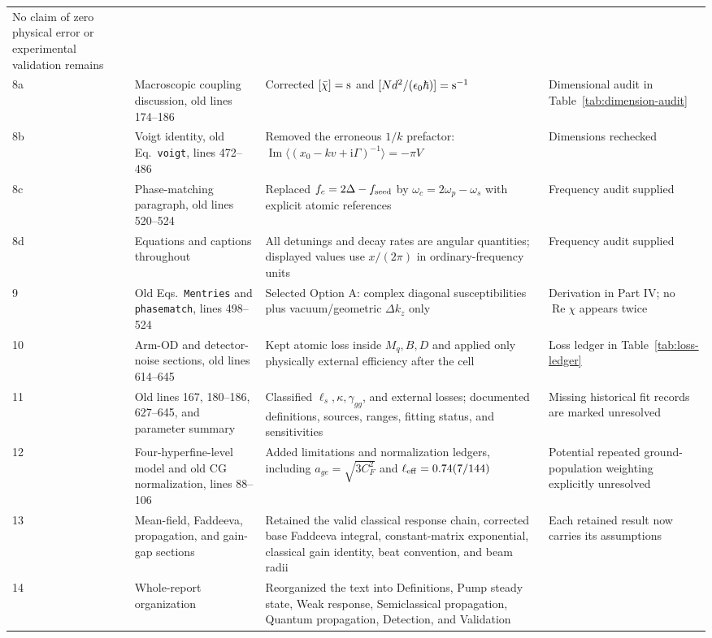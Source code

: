 \documentclass[11pt,a4paper]{article}
\newcommand{\ii}{\mathrm i}
\newcommand{\Rea}{\operatorname{Re}}
\newcommand{\Ima}{\operatorname{Im}}
\newcommand{\chibar}{\bar\chi}
\begin{document}
\begin{longtable}{C{0.65cm}L{4.2cm}L{5.2cm}L{4.3cm}}
No claim of zero physical error or experimental validation remains\\
8a & Macroscopic coupling discussion, old lines 174--186 &
Corrected $[\chibar]={\rm s}$ and
$[Nd^2/(\epsilon_0\hbar)]={\rm s}^{-1}$ &
Dimensional audit in Table~\ref{tab:dimension-audit}\\
8b & Voigt identity, old Eq.~\texttt{voigt}, lines 472--486 &
Removed the erroneous $1/k$ prefactor:
$\Ima\langle(x_0-kv+\ii\Gamma)^{-1}\rangle=-\pi V$ &
Dimensions rechecked\\
8c & Phase-matching paragraph, old lines 520--524 &
Replaced $f_c=2\Delta-f_{\rm seed}$ by
$\omega_c=2\omega_p-\omega_s$ with explicit atomic references &
Frequency audit supplied\\
8d & Equations and captions throughout &
All detunings and decay rates are angular quantities; displayed values use
$x/(2\pi)$ in ordinary-frequency units &
Frequency audit supplied\\
9 & Old Eqs.~\texttt{Mentries} and \texttt{phasematch}, lines 498--524 &
Selected Option A: complex diagonal susceptibilities plus vacuum/geometric
$\Delta k_z$ only &
Derivation in Part IV; no $\Rea\chi$ appears twice\\
10 & Arm-OD and detector-noise sections, old lines 614--645 &
Kept atomic loss inside $M_q,B,D$ and applied only physically external
efficiency after the cell &
Loss ledger in Table~\ref{tab:loss-ledger}\\
11 & Old lines 167, 180--186, 627--645, and parameter summary &
Classified $\ell_s,\kappa,\gamma_{gg}$, and external losses; documented
definitions, sources, ranges, fitting status, and sensitivities &
Missing historical fit records are marked unresolved\\
12 & Four-hyperfine-level model and old CG normalization, lines 88--106 &
Added limitations and normalization ledgers, including
$a_{ge}=\sqrt{3C_F^2}$ and $\ell_{\rm eff}=0.74(7/144)$ &
Potential repeated ground-population weighting explicitly unresolved\\
13 & Mean-field, Faddeeva, propagation, and gain-gap sections &
Retained the valid classical response chain, corrected base Faddeeva
integral, constant-matrix exponential, classical gain identity, beat
convention, and beam radii &
Each retained result now carries its assumptions\\
14 & Whole-report organization &
Reorganized the text into Definitions, Pump steady state, Weak response,
Semiclassical propagation, Quantum propagation, Detection, and Validation &

\end{longtable}
\end{document}
